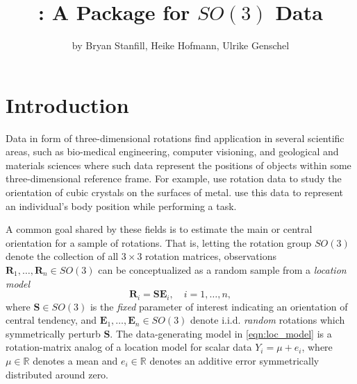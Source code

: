 
\title{: A Package for $SO(3)$ Data}
\author{by Bryan Stanfill, Heike Hofmann, Ulrike Genschel}

\maketitle


\section{Introduction}

Data in form of three-dimensional rotations find application in several scientific areas, such as bio-medical engineering, computer visioning, and geological and materials sciences where such data represent the positions of objects within some three-dimensional reference frame.  For example, \cite{humbert1996, bingham2009, bachmann2010} use rotation data to study the orientation of cubic crystals on the surfaces of metal.  \cite{rancourt2000} use this data to represent an individual's body position while performing a task. 

A common goal shared by these fields is to estimate the main or central orientation for a sample of rotations.  That is, letting the rotation group $SO(3)$ denote the collection of all $3\times 3$ rotation matrices, observations $\bm{R}_1,\ldots,\bm{R}_n \in SO(3)$ can be conceptualized as a random sample from a \textit{location model}
\begin{equation}
\label{eqn:loc_model}
\mathbf{R}_i = \bm{S} \bm{E}_i, \quad i=1,\ldots,n,
\end{equation}
where $\bm S \in SO(3)$ is the {\it fixed} parameter of interest indicating an orientation of central tendency, and $\bm{E}_1,\ldots,\bm{E}_n \in SO(3)$ denote i.i.d. {\it random} rotations which symmetrically perturb $\bm{S}$.  The data-generating model in \eqref{eqn:loc_model} is a rotation-matrix analog of a location model for scalar data $Y_i = \mu + e_i$, where $\mu \in \mathbb{R}$ denotes a mean and $e_i \in \mathbb{R}$ denotes an additive error symmetrically distributed around zero.

